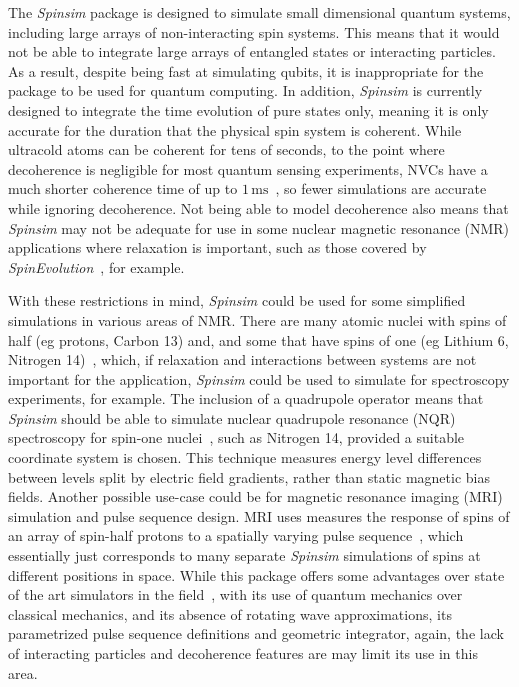 \documentclass{jors}
\begin{document}
		The \emph{Spinsim} package is designed to simulate small dimensional quantum systems, including large arrays of non-interacting spin systems.
		This means that it would not be able to integrate large arrays of entangled states or interacting particles.
		As a result, despite being fast at simulating qubits, it is inappropriate for the package to be used for quantum computing.
		In addition, \emph{Spinsim} is currently designed to integrate the time evolution of pure states only, meaning it is only accurate for the duration that the physical spin system is coherent.
		While ultracold atoms can be coherent for tens of seconds, to the point where decoherence is negligible for most quantum sensing experiments, NVCs have a much shorter coherence time of up to $ 1\,\text{ms} $~\cite{degen_quantum_2017}, so fewer simulations are accurate while ignoring decoherence.
		Not being able to model decoherence also means that \emph{Spinsim} may not be adequate for use in some nuclear magnetic resonance (NMR) applications where relaxation is important, such as those covered by \emph{SpinEvolution}~\cite{veshtort_spinevolution_2006}, for example. %

		With these restrictions in mind, \emph{Spinsim} could be used for some simplified simulations in various areas of NMR.
		There are many atomic nuclei with spins of half (eg protons, Carbon 13) and, and some that have spins of one (eg Lithium 6, Nitrogen 14)~\cite{fuller_nuclear_1976}, which, if relaxation and interactions between systems are not important for the application, \emph{Spinsim} could be used to simulate for spectroscopy experiments, for example.
		The inclusion of a quadrupole operator means that \emph{Spinsim} should be able to simulate nuclear quadrupole resonance (NQR) spectroscopy for spin-one nuclei~\cite{bain_nqr_2004}, such as Nitrogen 14, provided a suitable coordinate system is chosen.
		This technique measures energy level differences between levels split by electric field gradients, rather than static magnetic bias fields.
		Another possible use-case could be for magnetic resonance imaging (MRI) simulation and pulse sequence design.
		MRI uses measures the response of spins of an array of spin-half protons to a spatially varying pulse sequence~\cite{mckinnon_physics_1998}, which essentially just corresponds to many separate \emph{Spinsim} simulations of spins at different positions in space.
		While this package offers some advantages over state of the art simulators in the field~\cite{kose_fast_2019}, with its use of quantum mechanics over classical mechanics, and its absence of rotating wave approximations, its parametrized pulse sequence definitions and geometric integrator, again, the lack of interacting particles and decoherence features are may limit its use in this area.
\end{document}
